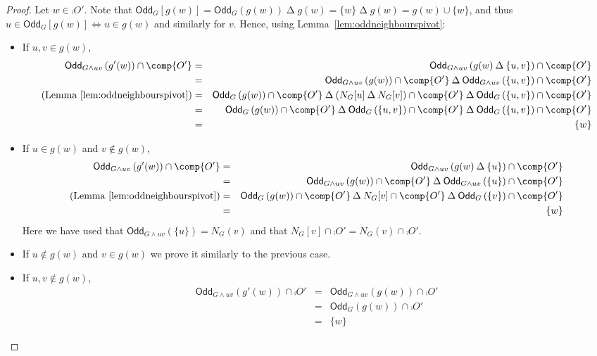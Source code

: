\documentclass[a4paper,onecolumn,superscriptaddress,11pt,accepted=2020-04-27]{quantumarticle}
\newcommand{\symd}{\mathbin{\Delta}\xspace}
\newcommand{\odd}[2]{\textsf{Odd}_{#1}\left(#2\right)}
\newcommand{\codd}[2]{\textsf{Odd}_{#1}\left[#2\right]}
\theoremstyle{definition}
\begin{document}
\begin{proof}
Let $w\in \comp{O'}$. Note that $\codd G {g(w)} = \odd G {g(w)} \symd g(w) = \{w\}\symd g(w) = g(w)\cup \{w\}$, and thus $u\in \codd G {g(w)} \iff u \in g(w)$ and similarly for $v$. Hence, using Lemma~\ref{lem:oddneighbourspivot}:
\begin{itemize}
\item If $u,v\in g(w)$, 
\begin{eqnarray*}
\odd {G\wedge uv}{g'(w)}\cap \comp{O'}&=&\odd {G\wedge uv}{g(w)\symd \{u,v\}}\cap \comp{O'}\\
&=&\odd {G\wedge uv}{g(w)}\cap \comp{O'}\symd \odd {G\wedge uv}{\{u,v\}}\cap \comp{O'}\\
(\textrm{Lemma \ref{lem:oddneighbourspivot}})
&=&\odd {G}{g(w)}\cap \comp{O'}\symd (N_G[u] \symd N_G[v])\cap \comp{O'}\symd \odd {G}{\{u,v\}}\cap \comp{O'}\\
&=&\odd {G}{g(w)}\cap \comp{O'}\symd \odd {G}{\{u,v\}}\cap \comp{O'} \symd \odd {G}{\{u,v\}}\cap \comp{O'}\\
&=&\{w\}
\end{eqnarray*}
\item If $u\in g(w)$ and $v\notin g(w)$,
\begin{eqnarray*}
\odd {G\wedge uv}{g'(w)}\cap \comp{O'}&=&\odd {G\wedge uv}{g(w)\symd \{u\}}\cap \comp{O'}\\
&=&\odd {G\wedge uv}{g(w)}\cap \comp{O'}\symd \odd {G\wedge uv}{\{u\}}\cap \comp{O'}\\
(\textrm{Lemma \ref{lem:oddneighbourspivot}})
&=&\odd {G}{g(w)}\cap \comp{O'} \symd N_G[v]\cap \comp{O'}\symd \odd {G}{\{v\}}\cap \comp{O'}\\
&=&\{w\}
\end{eqnarray*}
Here we have used that $\odd {G\wedge uv} {\{u\}} = N_G(v)$ and that $N_G[v]\cap \comp{O'} = N_G(v)\cap \comp{O'}$.
\item If $u\notin g(w)$ and $v\in g(w)$ we prove it similarly to the previous case.
\item If $u,v\notin g(w)$, 
\begin{eqnarray*}
\odd {G\wedge uv}{g'(w)}\cap \comp{O'}&=&\odd {G\wedge uv}{g(w)}\cap \comp{O'}\\
&=&\odd {G}{g(w)}\cap \comp{O'}\\ %
&=&\{w\}
\end{eqnarray*}
\end{itemize}
\end{proof}
\end{document}
